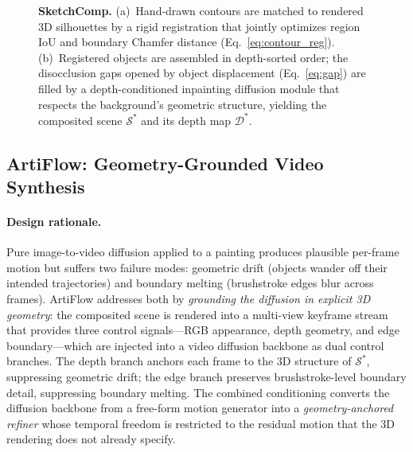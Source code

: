 \begin{figure}[t]
{}
    \caption{\textbf{SketchComp.} (a)~Hand-drawn contours are matched to
    rendered 3D silhouettes by a rigid registration that jointly optimizes
    region IoU and boundary Chamfer distance (Eq.~\ref{eq:contour_reg}).
    (b)~Registered objects are assembled in depth-sorted order; the
    disocclusion gaps opened by object displacement
    (Eq.~\ref{eq:gap}) are filled by a depth-conditioned inpainting
    diffusion module that respects the background's geometric structure,
    yielding the composited scene $\mathcal{S}^{*}$ and its depth map
    $\mathcal{D}^{*}$.}
    \label{fig:sketchcomp}
\end{figure}

\subsection{ArtiFlow: Geometry-Grounded Video Synthesis}
\label{sec:method:artiflow}

\paragraph{Design rationale.}
Pure image-to-video diffusion applied to a painting produces
plausible per-frame motion but suffers two failure modes: geometric
drift (objects wander off their intended trajectories) and boundary
melting (brushstroke edges blur across frames). ArtiFlow addresses
both by \emph{grounding the diffusion in explicit 3D geometry}: the
composited scene is rendered into a multi-view keyframe stream that
provides three control signals---RGB appearance, depth geometry, and
edge boundary---which are injected into a video diffusion backbone as
dual control branches. The depth branch anchors each frame to the 3D
structure of $\mathcal{S}^*$, suppressing geometric drift; the edge
branch preserves brushstroke-level boundary detail, suppressing
boundary melting. The combined conditioning converts the diffusion
backbone from a free-form motion generator into a \emph{geometry-anchored
refiner} whose temporal freedom is restricted to the residual motion
that the 3D rendering does not already specify.


